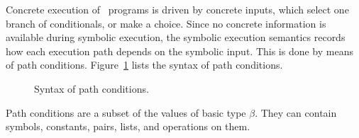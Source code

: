 Concrete execution of \TOPHAT\ programs is driven by concrete inputs, which select one branch of conditionals, or make a choice.
Since no concrete information is available during symbolic execution, the symbolic execution semantics records how each execution path depends on the symbolic input.
This is done by means of path conditions.
Figure~\ref{fig:syntaxpredicates} lists the syntax of path conditions.

\begin{figure}[ht]
  \small
  \caption{Syntax of path conditions.}
  \label{fig:syntaxpredicates}
\end{figure}

Path conditions are a subset of the values of basic type $\beta$.
They can contain symbols, constants, pairs, lists, and operations on them.
